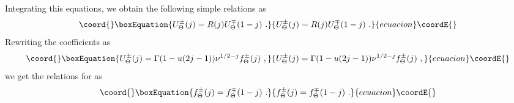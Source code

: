 \documentclass[a4paper,12pt]{article}
\begin{document}
Integrating this equations, we obtain the following simple relations as
\begin{equation}\coord{}\boxEquation{
 U^{\pm} _{\Theta} (j) = R (j) U^{\mp} _{\Theta} (1-j) ~.
}{
 U^{\pm} _{\Theta} (j) = R (j) U^{\mp} _{\Theta} (1-j) ~.
}{ecuacion}\coordE{}\end{equation}
Rewriting the coefficients as
\begin{equation}\coord{}\boxEquation{
 U^{\pm}_{\Theta} (j) = \Gamma (1 - u (2j - 1)) \nu^{1/2 - j} 
 f^{\pm}_{\Theta} (j) ~,
}{
 U^{\pm}_{\Theta} (j) = \Gamma (1 - u (2j - 1)) \nu^{1/2 - j} 
 f^{\pm}_{\Theta} (j) ~,
}{ecuacion}\coordE{}\end{equation}
we get the relations for \coordHE{} as 
\begin{equation}\coord{}\boxEquation{
 f^{\pm}_{\Theta} (j) = f^{\mp} _{\Theta} (1-j) ~.
\label{fpm}
}{
 f^{\pm}_{\Theta} (j) = f^{\mp} _{\Theta} (1-j) ~.
}{ecuacion}\coordE{}\end{equation}
\end{document}
